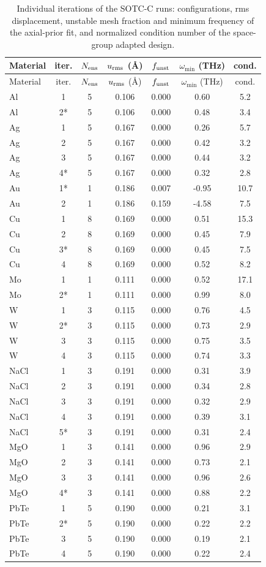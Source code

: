 \begin{longtable*}{lcccccc}
\caption{Individual iterations of the SOTC-C runs: configurations, rms displacement, unstable mesh fraction and minimum frequency of the axial-prior fit, and normalized condition number of the space-group adapted design.\label{tab:iterations}}\\
\hline\hline
Material & iter. & $N_{\rm ens}$ & $u_{\rm rms}$ (\AA) & $f_{\rm unst}$ & $\omega_{\min}$ (THz) & cond.\\
\hline
\endfirsthead
\hline
Material & iter. & $N_{\rm ens}$ & $u_{\rm rms}$ (\AA) & $f_{\rm unst}$ & $\omega_{\min}$ (THz) & cond.\\
\hline
\endhead
Al & 1 & 5 & 0.106 & 0.000 & 0.60 & 5.2\\
Al & 2* & 5 & 0.106 & 0.000 & 0.48 & 3.4\\
Ag & 1 & 5 & 0.167 & 0.000 & 0.26 & 5.7\\
Ag & 2 & 5 & 0.167 & 0.000 & 0.42 & 3.2\\
Ag & 3 & 5 & 0.167 & 0.000 & 0.44 & 3.2\\
Ag & 4* & 5 & 0.167 & 0.000 & 0.32 & 2.8\\
Au & 1* & 1 & 0.186 & 0.007 & -0.95 & 10.7\\
Au & 2 & 1 & 0.186 & 0.159 & -4.58 & 7.5\\
Cu & 1 & 8 & 0.169 & 0.000 & 0.51 & 15.3\\
Cu & 2 & 8 & 0.169 & 0.000 & 0.45 & 7.9\\
Cu & 3* & 8 & 0.169 & 0.000 & 0.45 & 7.5\\
Cu & 4 & 8 & 0.169 & 0.000 & 0.52 & 8.2\\
Mo & 1 & 1 & 0.111 & 0.000 & 0.52 & 17.1\\
Mo & 2* & 1 & 0.111 & 0.000 & 0.99 & 8.0\\
W & 1 & 3 & 0.115 & 0.000 & 0.76 & 4.5\\
W & 2* & 3 & 0.115 & 0.000 & 0.73 & 2.9\\
W & 3 & 3 & 0.115 & 0.000 & 0.75 & 3.5\\
W & 4 & 3 & 0.115 & 0.000 & 0.74 & 3.3\\
NaCl & 1 & 3 & 0.191 & 0.000 & 0.31 & 3.9\\
NaCl & 2 & 3 & 0.191 & 0.000 & 0.34 & 2.8\\
NaCl & 3 & 3 & 0.191 & 0.000 & 0.32 & 2.9\\
NaCl & 4 & 3 & 0.191 & 0.000 & 0.39 & 3.1\\
NaCl & 5* & 3 & 0.191 & 0.000 & 0.31 & 2.4\\
MgO & 1 & 3 & 0.141 & 0.000 & 0.96 & 2.9\\
MgO & 2 & 3 & 0.141 & 0.000 & 0.73 & 2.1\\
MgO & 3 & 3 & 0.141 & 0.000 & 0.96 & 2.6\\
MgO & 4* & 3 & 0.141 & 0.000 & 0.88 & 2.2\\
PbTe & 1 & 5 & 0.190 & 0.000 & 0.21 & 3.1\\
PbTe & 2* & 5 & 0.190 & 0.000 & 0.22 & 2.2\\
PbTe & 3 & 5 & 0.190 & 0.000 & 0.19 & 2.1\\
PbTe & 4 & 5 & 0.190 & 0.000 & 0.22 & 2.4\\
\hline\hline
\end{longtable*}
